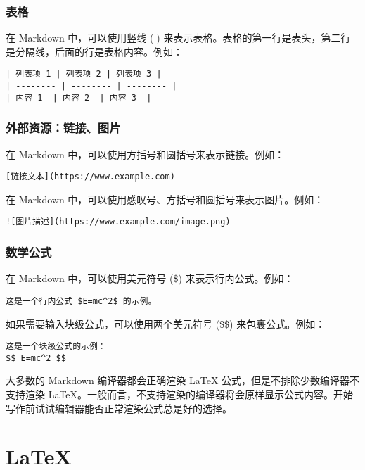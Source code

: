 \documentclass[../main.tex]{subfiles}
\begin{document}
\subsubsection{表格}

在 Markdown 中，可以使用竖线 (|) 来表示表格。表格的第一行是表头，第二行是分隔线，后面的行是表格内容。例如：

\begin{verbatim}
| 列表项 1 | 列表项 2 | 列表项 3 |
| -------- | -------- | -------- |
| 内容 1  | 内容 2  | 内容 3  |
\end{verbatim}

\subsubsection{外部资源：链接、图片}

在 Markdown 中，可以使用方括号和圆括号来表示链接。例如：

\begin{verbatim}
[链接文本](https://www.example.com)
\end{verbatim}

在 Markdown 中，可以使用感叹号、方括号和圆括号来表示图片。例如：

\begin{verbatim}
![图片描述](https://www.example.com/image.png)
\end{verbatim}

\subsubsection{数学公式}

在 Markdown 中，可以使用美元符号 (\$) 来表示行内公式。例如：

\begin{verbatim}
这是一个行内公式 $E=mc^2$ 的示例。
\end{verbatim}

如果需要输入块级公式，可以使用两个美元符号 (\$\$) 来包裹公式。例如：

\begin{verbatim}
这是一个块级公式的示例：
$$ E=mc^2 $$
\end{verbatim}

大多数的 Markdown 编译器都会正确渲染 LaTeX 公式，但是不排除少数编译器不支持渲染 LaTeX。一般而言，不支持渲染的编译器将会原样显示公式内容。开始写作前试试编辑器能否正常渲染公式总是好的选择。

\section{\LaTeX}
\end{document}
